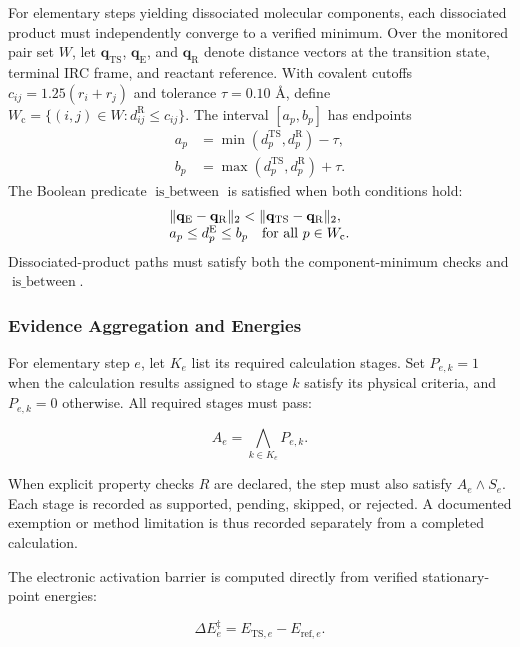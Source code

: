 For elementary steps yielding dissociated molecular components, each dissociated product must independently converge to a verified minimum. Over the monitored pair set $W$, let $\mathbf{q}_{\mathrm{TS}}$, $\mathbf{q}_{\mathrm{E}}$, and $\mathbf{q}_{\mathrm{R}}$ denote distance vectors at the transition state, terminal IRC frame, and reactant reference. With covalent cutoffs $c_{ij}=1.25(r_i+r_j)$ and tolerance $\tau=0.10$ Å, define $W_{\mathrm{c}}=\{(i,j)\in W:d_{ij}^{\mathrm{R}}\le c_{ij}\}$. The interval $[a_p,b_p]$ has endpoints
\[
\begin{aligned}
a_p&=\min(d_p^{\mathrm{TS}},d_p^{\mathrm{R}})-\tau,\\
b_p&=\max(d_p^{\mathrm{TS}},d_p^{\mathrm{R}})+\tau.
\end{aligned}
\]
The Boolean predicate $\operatorname{is\_between}$ is satisfied when both conditions hold:
\[
\begin{array}{@{}l@{}}
\|\mathbf{q}_{\mathrm{E}}-\mathbf{q}_{\mathrm{R}}\|_2
<\|\mathbf{q}_{\mathrm{TS}}-\mathbf{q}_{\mathrm{R}}\|_2,\\
a_p\le d_p^{\mathrm{E}}\le b_p
\quad\text{for all }p\in W_{\mathrm{c}}.
\end{array}
\]
Dissociated-product paths must satisfy both the component-minimum checks and $\operatorname{is\_between}$.

\subsubsection{Evidence Aggregation and Energies}
For elementary step $e$, let $K_e$ list its required calculation stages. Set $P_{e,k}=1$ when the calculation results assigned to stage $k$ satisfy its physical criteria, and $P_{e,k}=0$ otherwise. All required stages must pass:

\begin{equation}\label{eq:methods-13}
A_e=\bigwedge_{k\in K_e}P_{e,k}.
\end{equation}

When explicit property checks $R$ are declared, the step must also satisfy $A_e\wedge S_e$. Each stage is recorded as supported, pending, skipped, or rejected. A documented exemption or method limitation is thus recorded separately from a completed calculation.

The electronic activation barrier is computed directly from verified stationary-point energies:

\begin{equation}\label{eq:methods-14}
\Delta E_e^\ddagger=E_{\mathrm{TS},e}-E_{\mathrm{ref},e}.
\end{equation}

